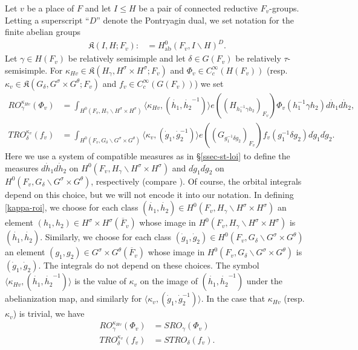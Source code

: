 \documentclass[12pt]{amsart}
\theoremstyle{remark}
\numberwithin{equation}{section}
\theoremstyle{definition}
\renewcommand{\bar}{\overline}
\numberwithin{equation}{subsection}
\begin{document}
Let $v$ be a place of $F$ and let $I \leq H$ be a pair of connected reductive $F_v$-groups.  Letting a superscript ``$D$'' denote the Pontryagin dual, we set notation for the finite abelian
groups
\begin{align} \label{localKgroup}
\mathfrak{K}(I,H;F_v):&=H^0_{\mathrm{ab}}(F_v,I \backslash H)^D.
\end{align}Let $\gamma \in H(F_v)$ be
relatively semisimple and let $\delta \in G(F_v)$
be relatively $\tau$-semisimple.
For  $\kappa_{Hv} \in \mathfrak{K}(H_{\gamma},H^{\sigma} \times H^{\sigma};F_v)$ and
 $\Phi_v \in C_c^{\infty}(H(F_v))$
 (resp. $\kappa_v \in \mathfrak{K}(G_{\delta},G^{\sigma} \times
 G^{\theta};F_v)$
and $f_v \in C_c^{\infty}(G(F_v))$) we set
\begin{align}\label{kappa-roi}
RO^{\kappa_{Hv}}_{\gamma}(\Phi_v)&=
\int_{H^0(F_v,H_{\gamma}\backslash H^{\sigma}\times H^{\sigma})}
\langle \kappa_{Hv}, (\dot{h_1},\dot{h_2}^{-1})\rangle e((H_{h_1^{-1}\gamma h_2})_
{F_v})\Phi_v(h_1^{-1}\gamma h_2) d\dot{h}_1d\dot{h}_2,\\
\nonumber TRO^{\kappa_v}_{\delta}(f_v)&=
\int_{H^0(F_v,G_{\delta} \backslash G^{\sigma} \times G^{\theta})}
\langle \kappa_v,(\dot{g}_1,\dot{g}_2^{-1}) \rangle e((G_{g_1^{-1}\delta g_2})_{F_v})
f_v(g_1^{-1} \delta g_2) d\dot{g}_1 d \dot{g}_2.
\end{align}Here we use a system of compatible measures as in \S \ref{ssec-st-loi}
to define the measures $d\dot{h}_1d\dot{h}_2$ on
$H^0(F_v, H_{\gamma} \backslash H^{\sigma} \times H^{\sigma})$ and $d\dot{g}_1d\dot{g}_2$ on
$H^0(F_v,G_{\delta} \backslash G^{\sigma} \times G^{\theta})$,
respectively (compare \cite[p.~42, 68]{Lab}).  Of course, the orbital
integrals depend on this choice, but we will not encode it into our notation.   In defining \eqref{kappa-roi}, we choose for each class $(\dot{h_1},\dot{h_2}) \in H^0(F_v,H_{\gamma}\backslash H^{\sigma} \times H^{\sigma})$ an element $(h_1,h_2) \in H^{\sigma} \times H^{\sigma}(\bar{F}_v)$ whose image in $H^0(F_v,H_{\gamma}\backslash H^{\sigma} \times H^{\sigma})$ is $(\dot{h_1},\dot{h_2})$.  Similarly, we choose for each class $(\dot{g}_1,\dot{g}_2) \in H^0(F_v,G_{\delta}\backslash G^{\sigma} \times G^{\theta})$ an element $(g_1,g_2) \in G^{\sigma} \times G^{\theta}(\bar{F}_v)$ whose image in $H^0(F_v,G_{\delta}\backslash G^{\sigma} \times G^{\theta})$ is $(\dot{g}_1,\dot{g}_2)$.
The integrals do not depend on these choices.
The symbol $\langle \kappa_{Hv},(\dot{h_1},\dot{h_2}^{-1}) \rangle$ is the value
of $\kappa_v$ on the image of $(\dot{h_1},\dot{h_2}^{-1})$ under the
abelianization map, and similarly for $\langle \kappa_{v},(\dot{g}_1,\dot{g}_2^{-1})\rangle$.
In the case that $\kappa_{Hv}$ (resp. $\kappa_v$) is trivial,
we have
\begin{align*}
RO^{\kappa_{Hv}}_{\gamma}(\Phi_v)&=SRO_{\gamma}(\Phi_v)\\
TRO^{\kappa_v}_{\delta}(f_v)&=STRO_{\delta}(f_v).
\end{align*}
\end{document}
